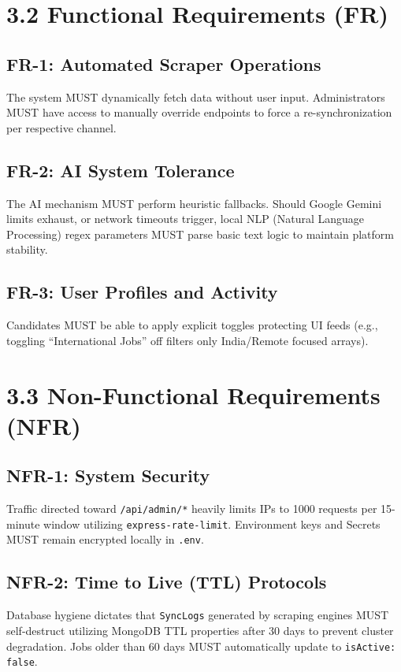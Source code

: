 \documentclass[12pt,a4paper,oneside]{report}
\begin{document}
\section{3.2 Functional Requirements (FR)}

\subsection{FR-1: Automated Scraper Operations}
The system MUST dynamically fetch data without user input. Administrators MUST have access to manually override endpoints to force a re-synchronization per respective channel.

\subsection{FR-2: AI System Tolerance}
The AI mechanism MUST perform heuristic fallbacks. Should Google Gemini limits exhaust, or network timeouts trigger, local NLP (Natural Language Processing) regex parameters MUST parse basic text logic to maintain platform stability.

\subsection{FR-3: User Profiles and Activity}
Candidates MUST be able to apply explicit toggles protecting UI feeds (e.g., toggling ``International Jobs'' off filters only India/Remote focused arrays).

\section{3.3 Non-Functional Requirements (NFR)}

\subsection{NFR-1: System Security}
Traffic directed toward \texttt{/api/admin/*} heavily limits IPs to 1000 requests per 15-minute window utilizing \texttt{express-rate-limit}. Environment keys and Secrets MUST remain encrypted locally in \texttt{.env}.

\subsection{NFR-2: Time to Live (TTL) Protocols}
Database hygiene dictates that \texttt{SyncLogs} generated by scraping engines MUST self-destruct utilizing MongoDB TTL properties after 30 days to prevent cluster degradation. Jobs older than 60 days MUST automatically update to \texttt{isActive: false}.
\end{document}
